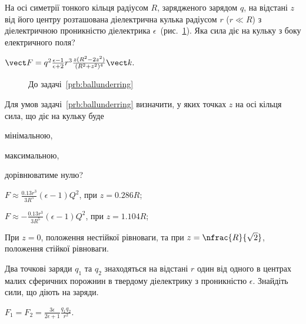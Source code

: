 \begin{problem}\label{prb:ballunderring}
На осі симетрії тонкого кільця радіусом $R$, зарядженого зарядом $q$, на відстані $z$ від його центру розташована діелектрична кулька радіусом $r$ ($r \ll R$) з діелектричною проникністю діелектрика $\epsilon$~(рис.~\ref{ballunderring}). Яка сила діє на кульку з боку електричного поля?
\begin{solution}
	$\vect F = q^2\frac{\epsilon - 1}{\epsilon + 2}r^3 \frac{z(R^2 - 2z^2)}{(R^2 + z^2)^4} \vect k.$
\end{solution}
\end{problem}
\begin{figure}[h!]\centering
	\caption{До задачі~\ref{prb:ballunderring}}
	\label{ballunderring}
\end{figure}

\begin{problem}%
Для умов задачі~\ref{prb:ballunderring} визначити, у яких точках $z$ на осі кільця сила, що діє на кульку буде
\begin{enumerate*}[label=\alph*)]
	\item мінімальною,
	\item максимальною,
	\item дорівнюватиме нулю?
\end{enumerate*}
\begin{solution}
	\begin{enumerate*}[label=\alph*)]
		\item $F \approx \frac{0.13r^3}{3R^5} (\epsilon - 1) Q^2$, при $z = 0.286 R$;
		\item $F \approx - \frac{0.13r^3}{3R^5} (\epsilon - 1) Q^2$, при $z = 1.104 R$;
		\item При $z = 0$, положення нестійкої рівноваги, та при $z = \nfrac{R}{\sqrt2}$, положення стійкої рівноваги.
	\end{enumerate*}
\end{solution}
\end{problem}

\begin{problem}%
    Два точкові заряди $q_1$ та $q_2$ знаходяться на відстані $r$ один від одного в центрах малих сферичних порожнин в твердому діелектрику з проникністю $\epsilon$. Знайдіть сили, що діють на заряди.
\begin{solution}
	$F_1 = F_2 = \frac{3\epsilon}{2\epsilon + 1}\frac{q_1q_2}{r^2}$.
\end{solution}
\end{problem}



